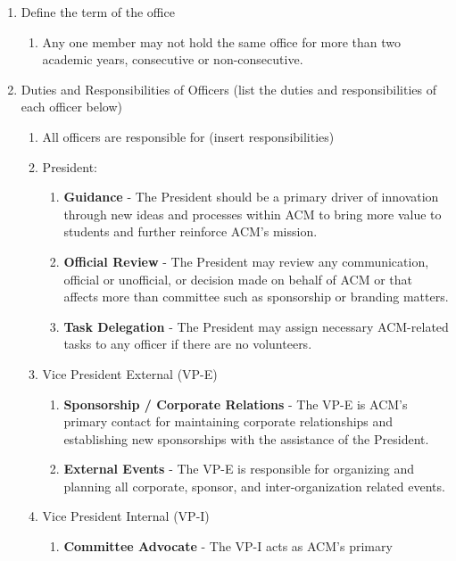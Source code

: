 \documentclass[11pt,a4paper,notitlepage]{article}
\begin{document}
\begin{enumerate}[label=\Alph*.]
  \item Define the term of the office
    \begin{enumerate}[label=\arabic*.]
      \item Any one member may not hold the same office for more than two
      academic years, consecutive or non-consecutive.
    \end{enumerate}
  \item Duties and Responsibilities of Officers (list the duties and
  responsibilities of each officer below)
    \begin{enumerate}[label=\arabic*.]
      \item All officers are responsible for (insert responsibilities)
      \item President:
        \begin{enumerate}[label=\alph*.]
          \item \textbf{Guidance} - The President should be a primary driver of
            innovation through new ideas and processes within ACM to bring more
            value to students and further reinforce ACM's mission.
          \item \textbf{Official Review} - The President may review any
            communication, official or unofficial, or decision made on behalf of
            ACM or that affects more than committee such as sponsorship or
            branding matters.
          \item \textbf{Task Delegation} - The President may assign necessary
            ACM-related tasks to any officer if there are no volunteers.
        \end{enumerate}
      \item Vice President External (VP-E)
        \begin{enumerate}[label=\alph*.]
          \item \textbf{Sponsorship / Corporate Relations} - The VP-E is ACM's
            primary contact for maintaining corporate relationships and
            establishing new sponsorships with the assistance of the President. 
          \item \textbf{External Events} - The VP-E is responsible for
            organizing and planning all corporate, sponsor, and
            inter-organization related events.
        \end{enumerate}
      \item Vice President Internal (VP-I)
        \begin{enumerate}[label=\alph*.]
          \item \textbf{Committee Advocate} - The VP-I acts as ACM's primary

\end{enumerate}
\end{enumerate}
\end{enumerate}
\end{document}

